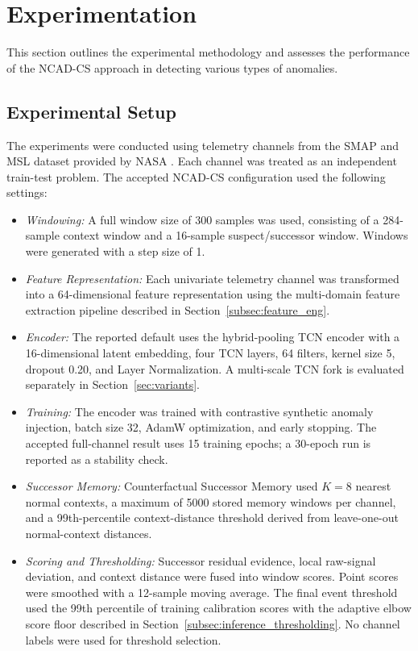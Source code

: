 \documentclass[journal]{IEEEtran}
\begin{document}
\section{Experimentation}
\label{sec:exp}

This section outlines the experimental methodology and assesses the performance of the NCAD-CS approach in detecting various types of anomalies.

\subsection{Experimental Setup}
\label{subsec:exp_setup}
The experiments were conducted using telemetry channels from the SMAP and MSL dataset provided by NASA \cite{Hundman2018b}. Each channel was treated as an independent train-test problem. The accepted NCAD-CS configuration used the following settings:
\begin{itemize}[noitemsep, topsep=0pt, leftmargin=*]
    \item \textit{Windowing:} A full window size of 300 samples was used, consisting of a 284-sample context window and a 16-sample suspect/successor window. Windows were generated with a step size of 1.
    \item \textit{Feature Representation:} Each univariate telemetry channel was transformed into a 64-dimensional feature representation using the multi-domain feature extraction pipeline described in Section~\ref{subsec:feature_eng}.
    \item \textit{Encoder:} The reported default uses the hybrid-pooling TCN encoder with a 16-dimensional latent embedding, four TCN layers, 64 filters, kernel size 5, dropout 0.20, and Layer Normalization. A multi-scale TCN fork is evaluated separately in Section~\ref{sec:variants}.
    \item \textit{Training:} The encoder was trained with contrastive synthetic anomaly injection, batch size 32, AdamW optimization, and early stopping. The accepted full-channel result uses 15 training epochs; a 30-epoch run is reported as a stability check.
    \item \textit{Successor Memory:} Counterfactual Successor Memory used $K=8$ nearest normal contexts, a maximum of 5000 stored memory windows per channel, and a 99th-percentile context-distance threshold derived from leave-one-out normal-context distances.
    \item \textit{Scoring and Thresholding:} Successor residual evidence, local raw-signal deviation, and context distance were fused into window scores. Point scores were smoothed with a 12-sample moving average. The final event threshold used the 99th percentile of training calibration scores with the adaptive elbow score floor described in Section~\ref{subsec:inference_thresholding}. No channel labels were used for threshold selection.
\end{itemize}
\end{document}
